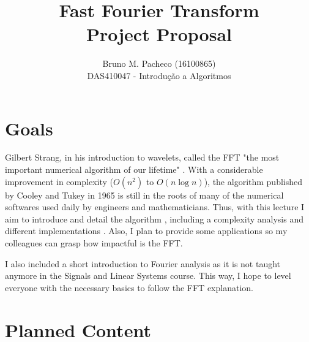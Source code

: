 \documentclass[a4paper]{report}
\begin{document}
 
\title{Fast Fourier Transform\\Project Proposal}
\author{Bruno M. Pacheco (16100865)\\
DAS410047 - Introdução a Algoritmos}
 
\maketitle

\section*{Goals}

Gilbert Strang, in his introduction to wavelets, called the FFT "the most important numerical algorithm of our lifetime" \cite{strang}. With a considerable improvement in complexity ($O\left( n^2 \right) $ to $O\left( n \log n\right) $), the algorithm published by Cooley and Tukey in 1965 \cite{Cooley1965} is still in the roots of many of the numerical softwares used daily by engineers and mathematicians. Thus, with this lecture I aim to introduce and detail the algorithm \cite{Lathi}, including a complexity analysis and different implementations \cite{ThomasH.Cormen2009}. Also, I plan to provide some applications so my colleagues can grasp how impactful is the FFT.

I also included a short introduction to Fourier analysis as it is not taught anymore in the Signals and Linear Systems course. This way, I hope to level everyone with the necessary basics to follow the FFT explanation.

\section*{Planned Content}
\end{document}
